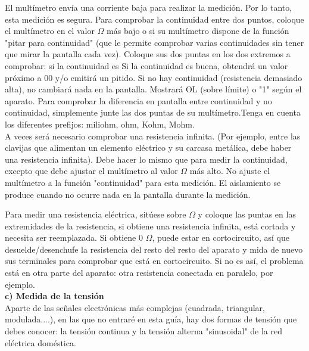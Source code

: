 El multímetro envía una corriente baja para realizar la medición.
Por lo tanto, esta medición es segura. Para comprobar la continuidad entre dos puntos, coloque el multímetro en el valor $\Omega$ más bajo o {\Large \loudspeaker}  si su multímetro dispone de la función "pitar para continuidad" (que le permite comprobar varias continuidades sin tener que mirar la pantalla cada vez).
Coloque sus dos puntas en los dos extremos a comprobar: si la continuidad es
Si la continuidad es buena, obtendrá un valor próximo a 00 y/o emitirá un pitido. Si no hay continuidad (resistencia demasiado alta), no cambiará nada en la pantalla. Mostrará OL (sobre límite) o "1" según el aparato.
Para comprobar la diferencia en pantalla entre continuidad y no continuidad, simplemente junte las dos puntas de su multímetro.Tenga en cuenta los diferentes prefijos: miliohm, ohm, Kohm, Mohm.\\

A veces será necesario comprobar una resistencia infinita.
(Por ejemplo, entre las clavijas que alimentan un elemento eléctrico y su carcasa metálica, debe haber una resistencia infinita).
Debe hacer lo mismo que para medir la continuidad, excepto que debe ajustar el multímetro al valor $\Omega$ más alto. No ajuste el multímetro a la función "continuidad" para esta medición.
El aislamiento se produce cuando no ocurre nada en la pantalla durante la medición.
\newpage

Para medir una resistencia eléctrica, sitúese sobre $\Omega$ y coloque las puntas en las extremidades de la resistencia, si obtiene una resistencia infinita, está cortada y necesita ser reemplazada.
Si obtiene 0 $\Omega$, puede estar en cortocircuito, así que desuelde/desenchufe la resistencia del resto del resto del aparato y mida de nuevo sus terminales para comprobar que está en cortocircuito. Si no es así, el problema está en otra parte del aparato: otra resistencia conectada en paralelo, por ejemplo.\\

\textbf{
c) Medida de la tensión}\\
Aparte de las señales electrónicas más complejas (cuadrada, triangular, modulada....), en las que no entraré en esta guía, hay dos formas de tensión que debes conocer: la tensión continua y la tensión alterna "sinusoidal" de la red eléctrica doméstica.

